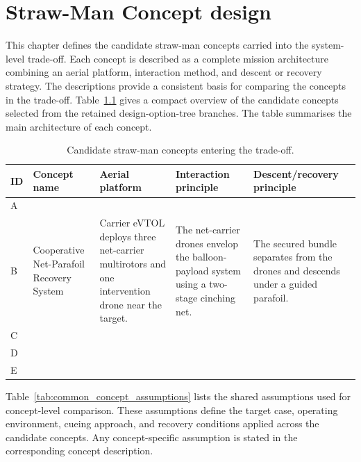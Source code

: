 \chapter{Straw-Man Concept design}

This chapter defines the candidate straw-man concepts carried into the system-level trade-off. Each concept is described as a complete mission architecture combining an aerial platform, interaction method, and descent or recovery strategy. The descriptions provide a consistent basis for comparing the concepts in the trade-off. Table~\ref{tab:strawman_concept_overview} gives a compact overview of the candidate concepts selected from the retained design-option-tree branches. The table summarises the main architecture of each concept. 

\begin{table}[H]
    \centering
    \small
    \caption{Candidate straw-man concepts entering the trade-off.}
    \label{tab:strawman_concept_overview}
    \begin{tabularx}{\textwidth}{@{}p{} p{} X X X@{}}
        \toprule
        \textbf{ID} 
        & \textbf{Concept name} 
        & \textbf{Aerial platform} 
        & \textbf{Interaction principle} 
        & \textbf{Descent/recovery principle} \\
        \midrule

        A &  &  &  &  \\

        B 
        & Cooperative Net-Parafoil Recovery System
        & Carrier eVTOL deploys three net-carrier multirotors and one intervention drone near the target.
        & The net-carrier drones envelop the balloon-payload system using a two-stage cinching net.
        & The secured bundle separates from the drones and descends under a guided parafoil. \\

        C &  &  &  &  \\
        D &  &  &  &  \\
        E &  &  &  &  \\

        \bottomrule
    \end{tabularx}
\end{table}

Table~\ref{tab:common_concept_assumptions} lists the shared assumptions used for concept-level comparison. These assumptions define the target case, operating environment, cueing approach, and recovery conditions applied across the candidate concepts. Any concept-specific assumption is stated in the corresponding concept description.

